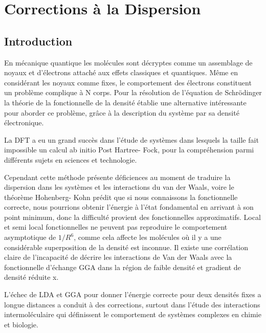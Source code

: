 \chapter[Corrections à la dispersion]{Corrections à la Dispersion}
\minitoc
\restoregeometry

\newpage

	\section*{Introduction}
	
	En mécanique quantique les molécules sont décryptes comme un assemblage de noyaux et d'électrons attaché aux effets classiques et quantiques. Même en considérant les noyaux comme fixes, le comportement des électrons constituent un problème complique à N corps. Pour la résolution de l'équation de Schrödinger la théorie de la fonctionnelle de la densité établie une alternative intéressante pour aborder ce problème, grâce à la description du système par sa densité électronique\cite{adamo2014decrire}.
	
	\bigskip
	La DFT a eu un grand succès dans l'étude de systèmes dans lesquels la taille fait impossible un calcul ab initio Post Hartree- Fock, pour la compréhension parmi différents sujets en sciences et technologie.\cite{neese2009prediction,sanchez1997density,waller2006hybrid}
	\bigskip
	
	Cependant cette méthode présente déficiences au moment de traduire la dispersion dans les systèmes et les interactions du van der Waals, voire le théorème Hohenberg- Kohn prédit que si nous connaissons la fonctionnelle correcte, nous pourrions obtenir l’énergie à l’état fondamental en arrivant à son point minimum, donc la difficulté provient des fonctionnelles approximatifs. Local et semi local fonctionnelles  ne peuvent pas reproduire le comportement asymptotique de $1/R^{6}$, comme cela affecte les molécules où il y a une considérable superposition de la densité est inconnue. Il existe une corrélation claire de l'incapacité de décrire les interactions de Van der Waals avec la fonctionnelle d'échange GGA dans la région de faible densité et gradient de densité réduite x. 
	
	\bigskip
	
	L'échec de LDA et GGA pour donner l'énergie correcte pour deux densités fixes a longue distances a conduit à des corrections, surtout dans l'étude des interactions intermoléculaire qui définissent le comportement de systèmes complexes en chimie et biologie. 
	
